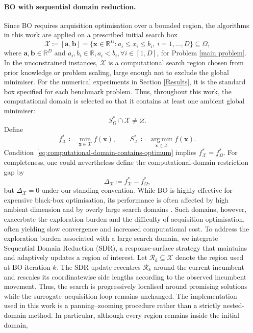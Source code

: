\documentclass[pdflatex,sn-mathphys-num]{sn-jnl}%
\theoremstyle{thmstyleone}%
\theoremstyle{thmstyletwo}%
\theoremstyle{thmstylethree}%
\begin{document}
\paragraph{BO with sequential domain reduction.}
Since BO requires acquisition optimisation over a bounded region, the algorithms in this work are applied on a prescribed initial search box
\[
    \mathcal X \coloneq [\mathbf a,\mathbf b]
    = \{\mathbf x\in\mathbb R^D : a_i\le x_i\le b_i,\ i=1,\ldots,D\}
    \subseteq \Omega,
\]
where \(\mathbf a,\mathbf b\in\mathbb R^D\) and \(a_i, b_i \in \mathbb{R}, a_i<b_i, \forall i \in [1, D]\), for Problem \eqref{main problem}. In the unconstrained instances, \(\mathcal X\) is a computational search region chosen from prior knowledge or problem scaling, large enough not to exclude the global minimiser. For the numerical experiments in Section \ref{Results}, it is the standard box specified for each benchmark problem. Thus, throughout this work, the computational domain is selected so that it contains at least one ambient global minimiser:
\begin{equation}
    S_\Omega^\ast\cap\mathcal X\neq\varnothing.
\label{eq:computational-domain-contains-optimum}
\end{equation}
Define
\[
    f_{\mathcal X}^\ast
    \coloneq
    \min_{\mathbf x\in\mathcal X}f(\mathbf x),
    \qquad
    S_{\mathcal X}^\ast
    \coloneq
    \operatorname*{arg\,min}_{\mathbf x\in\mathcal X}f(\mathbf x).
\]
Condition~\eqref{eq:computational-domain-contains-optimum} implies $f_{\mathcal X}^\ast=f_\Omega^\ast.$ For completeness, one could nevertheless define the computational-domain restriction gap by
\[
    \Delta_{\mathcal X}
    \coloneq
    f_{\mathcal X}^\ast-f_\Omega^\ast,
\]
but \(\Delta_{\mathcal X}=0\) under our standing convention. While BO is highly effective for expensive black-box optimisation, its performance is often affected by high ambient dimension and by overly large search domains \cite{hvarfner2024vanillabayesianoptimizationperforms, Shahriari2016}. Such domains, however, exacerbate the exploration burden and the difficulty of acquisition optimisation, often yielding slow convergence and increased computational cost. To address the exploration burden associated with a large search domain, we integrate Sequential Domain Reduction (SDR), a response-surface strategy that maintains and adaptively updates a region of interest. Let $\mathcal{R}_k\subseteq\mathcal{X}$ denote the region used at BO iteration $k$. The SDR update recentres $\mathcal{R}_k$ around the current incumbent and rescales its coordinatewise side lengths according to the observed incumbent movement. Thus, the search is progressively localised around promising solutions while the surrogate--acquisition loop remains unchanged. The implementation used in this work is a panning--zooming procedure rather than a strictly nested-domain method. In particular, although every region remains inside the initial domain,
\end{document}
